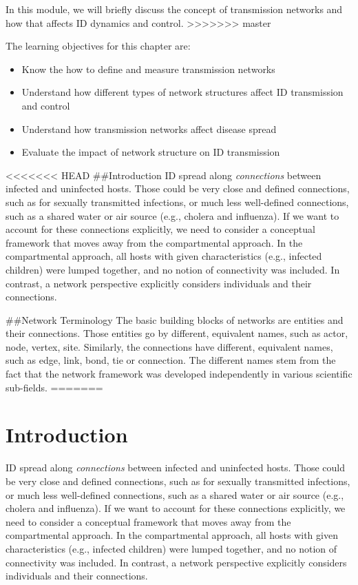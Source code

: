 \documentclass[]{book}
\providecommand{\tightlist}{%
  \setlength{\itemsep}{0pt}\setlength{\parskip}{0pt}}
\theoremstyle{definition}
\theoremstyle{definition}
\theoremstyle{definition}
\theoremstyle{remark}
\begin{document}
In this module, we will briefly discuss the concept of transmission
networks and how that affects ID dynamics and control.
>>>>>>> master

The learning objectives for this chapter are:

\begin{itemize}
\tightlist
\item
  Know the how to define and measure transmission networks
\item
  Understand how different types of network structures affect ID
  transmission and control
\item
  Understand how transmission networks affect disease spread
\item
  Evaluate the impact of network structure on ID transmission
\end{itemize}

<<<<<<< HEAD
\#\#Introduction ID spread along \emph{connections} between infected and
uninfected hosts. Those could be very close and defined connections,
such as for sexually transmitted infections, or much less well-defined
connections, such as a shared water or air source (e.g., cholera and
influenza). If we want to account for these connections explicitly, we
need to consider a conceptual framework that moves away from the
compartmental approach. In the compartmental approach, all hosts with
given characteristics (e.g., infected children) were lumped together,
and no notion of connectivity was included. In contrast, a network
perspective explicitly considers individuals and their connections.

\#\#Network Terminology The basic building blocks of networks are
entities and their connections. Those entities go by different,
equivalent names, such as actor, node, vertex, site. Similarly, the
connections have different, equivalent names, such as edge, link, bond,
tie or connection. The different names stem from the fact that the
network framework was developed independently in various scientific
sub-fields.
=======
\section{Introduction}\label{introduction-17}

ID spread along \emph{connections} between infected and uninfected
hosts. Those could be very close and defined connections, such as for
sexually transmitted infections, or much less well-defined connections,
such as a shared water or air source (e.g., cholera and influenza). If
we want to account for these connections explicitly, we need to consider
a conceptual framework that moves away from the compartmental approach.
In the compartmental approach, all hosts with given characteristics
(e.g., infected children) were lumped together, and no notion of
connectivity was included. In contrast, a network perspective explicitly
considers individuals and their connections.
\end{document}

